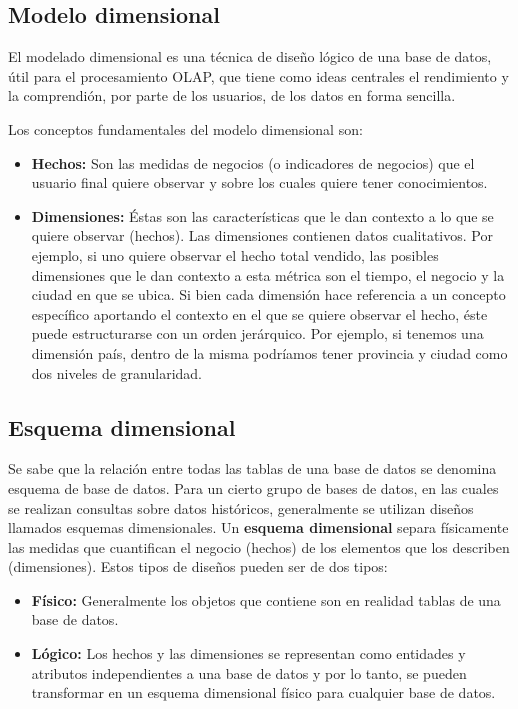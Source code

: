 \documentclass[a4paper,11pt]{article}
\begin{document}
    
    \subsection{Modelo dimensional}
    
    El modelado dimensional es una técnica de diseño lógico de una base de datos, útil para el procesamiento OLAP, que tiene como ideas centrales el
    rendimiento y la comprendión, por parte de los usuarios, de los datos en forma sencilla.
    
    Los conceptos fundamentales del modelo dimensional son:
    
    \begin{itemize}
      \item \textbf{Hechos:} Son las medidas de negocios (o indicadores de negocios) que el usuario final quiere observar y sobre los cuales quiere tener
      conocimientos.
      \item \textbf{Dimensiones:} Éstas son las características que le dan contexto a lo que se quiere observar (hechos).
      Las dimensiones contienen datos cualitativos. Por ejemplo, si uno quiere observar el hecho total 
      vendido, las posibles dimensiones que le dan contexto a esta métrica son el tiempo, el negocio y la ciudad en que se ubica. Si bien cada dimensión hace
      referencia a un concepto específico aportando el contexto en el que se quiere observar el hecho, éste puede estructurarse con un orden jerárquico.
      Por ejemplo, si tenemos una dimensión país, dentro de la misma podríamos tener provincia y ciudad como dos niveles de granularidad. 
    \end{itemize}
    
    
    \subsection{Esquema dimensional}
    
    Se sabe que la relación entre todas las tablas de una base de datos se denomina esquema de base de datos. Para un cierto grupo de bases de datos, en las
    cuales se realizan consultas sobre datos históricos, generalmente se utilizan diseños llamados esquemas dimensionales. Un \textbf{esquema dimensional}
    separa físicamente las medidas que cuantifican el negocio (hechos) de los elementos que los describen (dimensiones). Estos tipos de diseños pueden ser de
    dos tipos:
    
    \begin{itemize}
      \item \textbf{Físico:} Generalmente los objetos que contiene son en realidad tablas de una base de datos.
      \item \textbf{Lógico:} Los hechos y las dimensiones se representan como entidades y atributos independientes a una base de datos y por lo tanto,
      se pueden transformar en un esquema dimensional físico para cualquier base de datos.
    \end{itemize}
    
\end{document}
